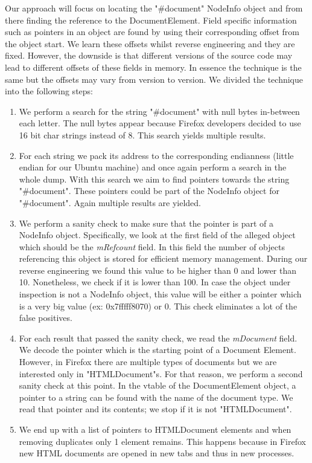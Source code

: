 Our approach will focus on locating the "\#document" NodeInfo object
and from there finding the reference to the DocumentElement. Field
specific information such as pointers in an object are found by using
their corresponding offset from the object start. We learn these
offsets whilst reverse engineering and they are fixed. However, the
downside is that different versions of the source code may lead to
different offsets of these fields in memory. In essence the technique
is the same but the offsets may vary from version to version. We
divided the technique into the following steps:

\begin{enumerate}
\item We perform a search for the string "\#document" with null bytes
  in-between each letter. The null bytes appear because Firefox
  developers decided to use 16 bit char strings instead of 8. This
  search yields multiple results.
\item For each string we pack its address to the corresponding
  endianness (little endian for our Ubuntu machine) and once again
  perform a search in the whole dump. With this search we aim to find
  pointers towards the string "\#document". These pointers could be
  part of the NodeInfo object for "\#document". Again multiple results
  are yielded.
\item We perform a sanity check to make sure that the pointer is part
  of a NodeInfo object. Specifically, we look at the first field of
  the alleged object which should be the \textit{mRefcount} field. In
  this field the number of objects referencing this object is stored
  for efficient memory management. During our reverse engineering we
  found this value to be higher than 0 and lower than 10. Nonetheless,
  we check if it is lower than 100. In case the object under
  inspection is not a NodeInfo object, this value will be either a
  pointer which is a very big value (ex: 0x7fffff8070) or 0. This
  check eliminates a lot of the false positives.
\item For each result that passed the sanity check, we read the
  \textit{mDocument} field. We decode the pointer which is the
  starting point of a Document Element. However, in Firefox there are
  multiple types of documents but we are interested only in
  "HTMLDocument"s. For that reason, we perform a second sanity check at
  this point. In the vtable of the DocumentElement object, a pointer to
  a string can be found with the name of the document type. We read
  that pointer and its contents; we stop if it is not "HTMLDocument".
\item We end up with a list of pointers to HTMLDocument elements and
  when removing duplicates only 1 element remains. This happens
  because in Firefox new HTML documents are opened in new tabs and
  thus in new processes.
\end{enumerate}

